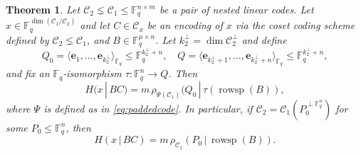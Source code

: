 \documentclass[onecolumn,draftclsnofoot,12pt]{IEEEtran}
\newcommand{\F}{\mathbb{F}}
\newcommand{\C}{\mathcal{C}}
\DeclareMathOperator{\rowsp}{rowsp}
\theoremstyle{plain} %
\newtheorem{theorem}{Theorem}
\theoremstyle{definition}
\begin{document}
\begin{theorem}
\label{thm:equiv2}
Let $\C_2 \lneq \C_1 \leq\F_q^{n\times m}$ be a pair of nested linear codes. Let $x \in \F_q^{\dim(\C_1/\C_2)}$ and let $C \in \C_x$ be an encoding of $x$ via the coset coding scheme defined by $\C_2 \lneq \C_1$, and $B\in \F_q^{\mu \times n}$. Let $k_2^\perp = \dim \C_2^\perp$ and define 
    $$Q_0= \langle \mathbf{e}_1,\ldots,\mathbf{e}_{k_2^\perp}\rangle_{\F_q}\leq \F_q^{k_2^\perp + n},\quad Q = \langle \mathbf{e}_{k_2^\perp + 1},\ldots,\mathbf{e}_{k_2^\perp+n} \rangle_{\F_q} \leq \F_q^{k_2^\perp +n},$$ 
and fix an $\F_q$-isomorphism $\tau \colon \F_q^n\rightarrow Q$. Then
\begin{equation}
    H(x\,|\, BC) =  m\,\rho_{\Psi(\C_1)}(Q_0 \,|\, \tau(\rowsp(B)), \label{eq:portscoset}
\end{equation}
where $\Psi$ is defined as in \eqref{eq:paddedcode}. In particular, if $\C_2 = \C_1(P_0^{\perp \F_q^n})$ for some $P_0\leq \F_q^n$, then
\begin{equation}
    H(x\,|\, BC) =  m \, \rho_{\C_1}(P_0\,|\,\rowsp(B)). \label{eq:portstonested}
\end{equation}
\end{theorem}
\end{document}

